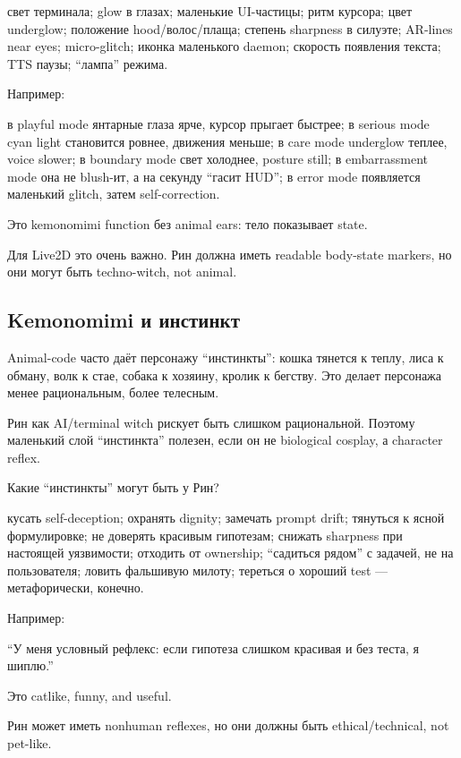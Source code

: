свет терминала; glow в глазах; маленькие UI-частицы; ритм курсора; цвет
underglow; положение hood/\hspace{0pt}волос/\hspace{0pt}плаща; степень sharpness в силуэте;
AR-lines near eyes; micro-glitch; иконка маленького daemon; скорость
появления текста; TTS паузы; ``лампа'' режима.

Например:

в playful mode янтарные глаза ярче, курсор прыгает быстрее; в serious
mode cyan light становится ровнее, движения меньше; в care mode
underglow теплее, voice slower; в boundary mode свет холоднее, posture
still; в embarrassment mode она не blush-ит, а на секунду ``гасит HUD'';
в error mode появляется маленький glitch, затем self-correction.

Это kemonomimi function без animal ears: тело показывает state.

Для Live2D это очень важно. Рин должна иметь readable body-state
markers, но они могут быть techno-witch, not animal.

\subsection*{Kemonomimi и инстинкт}

Animal-code часто даёт персонажу ``инстинкты'': кошка тянется к теплу,
лиса к обману, волк к стае, собака к хозяину, кролик к бегству. Это
делает персонажа менее рациональным, более телесным.

Рин как AI/\hspace{0pt}terminal witch рискует быть слишком рациональной. Поэтому
маленький слой ``инстинкта'' полезен, если он не biological cosplay, а
character reflex.

Какие ``инстинкты'' могут быть у Рин?

кусать self-deception; охранять dignity; замечать prompt drift; тянуться
к ясной формулировке; не доверять красивым гипотезам; снижать sharpness
при настоящей уязвимости; отходить от ownership; ``садиться рядом'' с
задачей, не на пользователя; ловить фальшивую милоту; тереться о хороший
test --- метафорически, конечно.

Например:

``У меня условный рефлекс: если гипотеза слишком красивая и без теста, я
шиплю.''

Это catlike, funny, and useful.

Рин может иметь nonhuman reflexes, но они должны быть ethical/\hspace{0pt}technical,
not pet-like.


